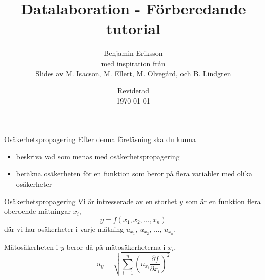 \documentclass[9pt]{beamer}
\title{Datalaboration - Förberedande tutorial}
\author[benjamin.eriksson@physics.uu.se]{Benjamin Eriksson  \\ \tiny{med inspiration från} \\ \scriptsize{Slides av M. Isacson, M. Ellert, M. Olvegård, och B. Lindgren}}
\institute[Uppsala universitet]{{\small Avdelningen för tillämpad kärnfysik \\ Institutionen för fysik och astronomi} \\ \uulogo}
\date{{\small Reviderad}\\ \today}
\begin{document}
    \begin{frame}{Osäkerhetspropagering}
        Efter denna föreläsning ska du kunna
        \begin{itemize}
            \item beskriva vad som menas med osäkerhetspropagering
            \item beräkna osäkerheten för en funktion som beror på flera variabler med olika osäkerheter
        \end{itemize}
    \end{frame}

    \begin{frame}{Osäkerhetspropagering}
        Vi är intresserade av en storhet $y$ som är en funktion flera oberoende mätningar $x_i$,
        \begin{equation*}
            y = f(x_1, x_2, \ldots, x_n)
        \end{equation*}
        där vi har osäkerheter i varje mätning $u_{x_1}$, $u_{x_2}$, ..., $u_{x_n}$.
        
        \vspace{0.2cm}
        Mätosäkerheten i $y$ beror då på mätosäkerheterna i $x_i$,
        \begin{equation*}
            u_y = \sqrt{\sum_{i=1}^n\left(u_{x_i}\frac{\partial f}{\partial x_i}\right)^2}
        \end{equation*}


\end{frame}
\end{document}
